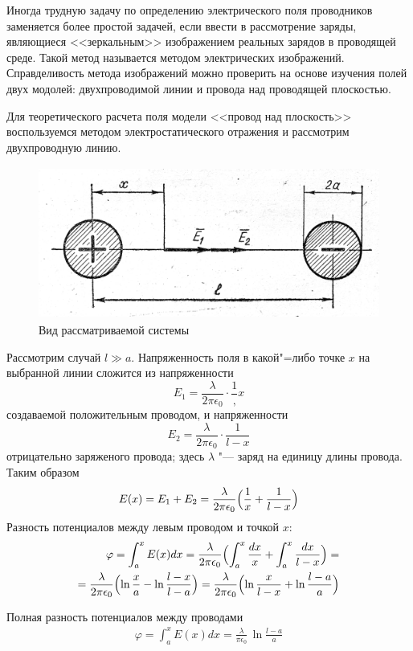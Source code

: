 Иногда трудную задачу по определению электрического поля проводников заменяется более простой задачей, если ввести в рассмотрение заряды, являющиеся <<зеркальным>> изображением реальных зарядов в проводящей среде. Такой метод называется методом электрических изображений. Справделивость метода изображений можно проверить на основе изучения полей двух модолей: двухпроводимой линии и провода над проводящей плоскостью.

Для теоретического расчета поля модели <<провод над плоскость>> воспользуемся методом электростатического отражения и рассмотрим двухпроводную линию.
\begin{figure}[H]
  \centering
  \includegraphics[height = 5cm]{example.png}
  \caption*{Вид рассматриваемой системы}
\end{figure}
Рассмотрим случай $l \gg a$. Напряженность поля в какой"=либо точке $x$ на выбранной линии сложится из напряженности 
$$
  E_1 = \frac{\lambda}{2\pi\epsilon_0} \cdot \frac{1},{x}
$$
создаваемой положительным проводом, и напряженности 
$$
  E_2 = \frac{\lambda}{2\pi\epsilon_0} \cdot \frac{1}{l - x}
$$
отрицательно заряженого провода; здесь $\lambda$ "--- заряд на единицу длины провода. Таким образом
$$
  E(x) = E_1 + E_2 = \frac{\lambda}{2\pi\epsilon_0}\Bigl(\frac{1}{x} + \frac{1}{l - x}\Bigr)
$$
Разность потенциалов между левым проводом и точкой $x$:
\begin{align*}
  \varphi = \int_{a}^{x} E(x)dx = \frac{\lambda}{2\pi\epsilon_0}\Bigl(\int_{a}^{x} \frac{dx}{x} + \int_{a}^{x}\frac{dx}{l - x}\Bigr) = \\
  = \frac{\lambda}{2\pi\epsilon_0}\Bigl(\ln{\frac{x}{a}} - \ln{\frac{l - x}{l - a}}\Bigr) = \frac{\lambda}{2\pi\epsilon_0}\Bigl(\ln{\frac{x}{l - x}} + \ln{\frac{l - a}{a}}\Bigr)
\end{align*}

Полная разность потенциалов между проводами
\begin{align*}
  \varphi = \int_{a}^{x} E(x)dx = \frac{\lambda}{\pi\epsilon_0}\, \ln{\frac{l - a}{a}}
\end{align*}

